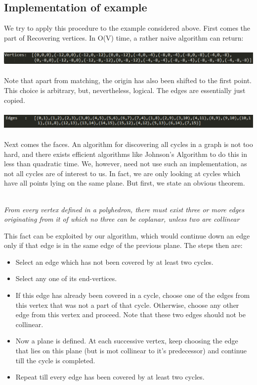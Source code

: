 \documentclass[
11pt, %
english, %
singlespacing, %
headsepline, %
]{MastersDoctoralThesis} %
\begin{document}
\subsection{Implementation of example}
We try to apply this procedure to the example considered above. First comes the part of Recovering vertices. In O(V) time, a rather naive algorithm can return:\\ \\
\includegraphics[width=\textwidth]{2d-3d-6}\\ \\
Note that apart from matching, the origin has also been shifted to the first point. This choice is arbitrary, but, nevertheless, logical. The edges are essentially just copied. \\ \\
\includegraphics[width=\textwidth]{2d-3d-7}\\ \\
Next comes the faces. An algorithm for discovering all cycles in a graph is not too hard, and there exists efficient algorithms like Johnson’s Algorithm to do this in less than quadratic time. We, however, need not use such an implementation, as not all cycles are of interest to us. In fact, we are only looking at cycles which have all points lying on the same plane. But first, we state an obvious theorem.\\ \\
\begin{center}
\emph{From every vertex defined in a polyhedron, there must exist three or more edges originating from it of which no three can be coplanar, unless two are collinear}
\end{center}
This fact can be exploited by our algorithm, which would continue down an edge only if that edge is in the same edge of the previous plane. The steps then are:
\begin{itemize}
\item Select an edge which has not been covered by at least two cycles.
\item Select any one of its end-vertices. 
\item If this edge has already been covered in a cycle, choose one of the edges from this vertex that was not a part of that cycle. Otherwise, choose any other edge from this vertex and proceed. Note that these two edges should not be collinear.
\item Now a plane is defined. At each successive vertex, keep choosing the edge that lies on this plane (but is mot collinear to it's predecessor) and continue till the cycle is completed.
\item Repeat till every edge has been covered by at least two cycles.
\end{itemize}
\end{document}
